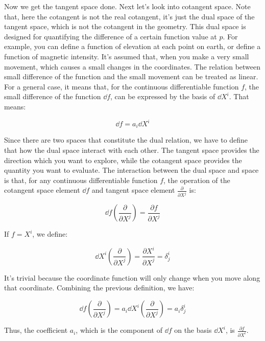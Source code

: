 \documentclass[../main.tex]{subfiles}
\begin{document}
Now we get the tangent space done. Next let's look into cotangent space. Note that, here the cotangent is not the real cotangent, it's just the dual space of the tangent space, which is not the cotangent in the geometry. This dual space is designed for quantifying the difference of a certain function value at $p$. For example, you can define a function of elevation at each point on earth, or define a function of magnetic intensity. It's assumed that, when you make a very small movement, which causes a small changes in the coordinates. The relation between small difference of the function and the small movement can be treated as linear. For a general case, it means that, for the continuous differentiable function $f$, the small difference of the function $\dd{f}$, can be expressed by the basis of $\dd{X^i}$. That means:

\begin{equation}
    \dd{f} = a_i\dd{X^i}
\end{equation}

Since there are two spaces that constitute the dual relation, we have to define that how the dual space interact with each other. The tangent space provides the direction which you want to explore, while the cotangent space provides the quantity you want to evaluate. The interaction between the dual space and space is that, for any continuous differentiable function $f$, the operation of the cotangent space element $\dd{f}$ and tangent space element $\frac{\partial }{\partial X^j}$ is:

\begin{equation}
    \dd{f}(\frac{\partial }{\partial X^j}) = \frac{\partial f}{\partial X^j}
\end{equation}

If $f = X^i$, we define:

\begin{equation}
    \dd{X^i}(\frac{\partial}{\partial X^j}) = \frac{\partial X^i}{\partial X^j} = \delta^i_j
\end{equation}

It's trivial because the coordinate function will only change when you move along that coordinate. Combining the previous definition, we have:

\begin{equation}
    \dd{f}(\frac{\partial }{\partial X^j}) = a_i\dd{X^i}(\frac{\partial }{\partial X^j}) = a_i\delta^i_j
\end{equation}

Thus, the coefficient $a_i$, which is the component of $\dd{f}$ on the basis $\dd{X^i}$, is $\frac{\partial f}{\partial X^i}$.
\end{document}
